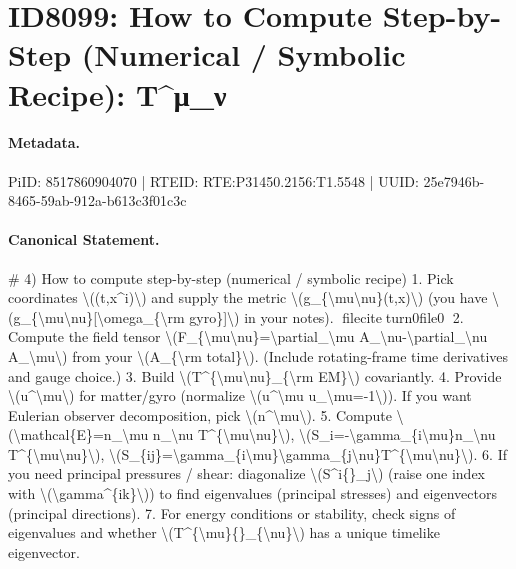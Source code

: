\section*{ID8099: How to Compute Step-by-Step (Numerical / Symbolic Recipe): T\textasciicircum{}μ\_ν}
\paragraph{Metadata.}
PiID: 8517860904070 | RTEID: RTE:P31450.2156:T1.5548 | UUID: 25e7946b-8465-59ab-912a-b613c3f01c3c

\paragraph{Canonical Statement.}
\# 4) How to compute step-by-step (numerical / symbolic recipe) 1. Pick coordinates \textbackslash{}((t,x\textasciicircum{}i)\textbackslash{}) and supply the metric \textbackslash{}(g\_\{\textbackslash{}mu\textbackslash{}nu\}(t,x)\textbackslash{}) (you have \textbackslash{}(g\_\{\textbackslash{}mu\textbackslash{}nu\}[\textbackslash{}omega\_\{\textbackslash{}rm gyro\}]\textbackslash{}) in your notes). fileciteturn0file0 2. Compute the field tensor \textbackslash{}(F\_\{\textbackslash{}mu\textbackslash{}nu\}=\textbackslash{}partial\_\textbackslash{}mu A\_\textbackslash{}nu-\textbackslash{}partial\_\textbackslash{}nu A\_\textbackslash{}mu\textbackslash{}) from your \textbackslash{}(A\_\{\textbackslash{}rm total\}\textbackslash{}). (Include rotating-frame time derivatives and gauge choice.) 3. Build \textbackslash{}(T\textasciicircum{}\{\textbackslash{}mu\textbackslash{}nu\}\_\{\textbackslash{}rm EM\}\textbackslash{}) covariantly. 4. Provide \textbackslash{}(u\textasciicircum{}\textbackslash{}mu\textbackslash{}) for matter/gyro (normalize \textbackslash{}(u\textasciicircum{}\textbackslash{}mu u\_\textbackslash{}mu=-1\textbackslash{})). If you want Eulerian observer decomposition, pick \textbackslash{}(n\textasciicircum{}\textbackslash{}mu\textbackslash{}). 5. Compute \textbackslash{}(\textbackslash{}mathcal\{E\}=n\_\textbackslash{}mu n\_\textbackslash{}nu T\textasciicircum{}\{\textbackslash{}mu\textbackslash{}nu\}\textbackslash{}), \textbackslash{}(S\_i=-\textbackslash{}gamma\_\{i\textbackslash{}mu\}n\_\textbackslash{}nu T\textasciicircum{}\{\textbackslash{}mu\textbackslash{}nu\}\textbackslash{}), \textbackslash{}(S\_\{ij\}=\textbackslash{}gamma\_\{i\textbackslash{}mu\}\textbackslash{}gamma\_\{j\textbackslash{}nu\}T\textasciicircum{}\{\textbackslash{}mu\textbackslash{}nu\}\textbackslash{}). 6. If you need principal pressures / shear: diagonalize \textbackslash{}(S\textasciicircum{}i\{\}\_j\textbackslash{}) (raise one index with \textbackslash{}(\textbackslash{}gamma\textasciicircum{}\{ik\}\textbackslash{})) to find eigenvalues (principal stresses) and eigenvectors (principal directions). 7. For energy conditions or stability, check signs of eigenvalues and whether \textbackslash{}(T\textasciicircum{}\{\textbackslash{}mu\}\{\}\_\{\textbackslash{}nu\}\textbackslash{}) has a unique timelike eigenvector.

